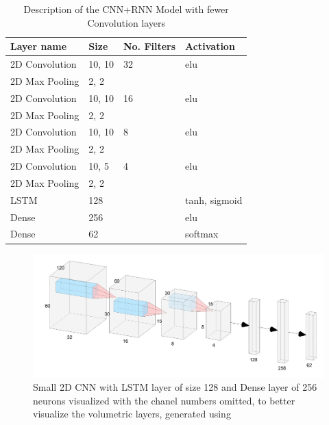 \documentclass[12pt]{article}
\theoremstyle{definition}
\begin{document}
	\begin{table}[h]
		\centering
		\renewcommand{\arraystretch}{1.5}

		\caption{Description of the CNN+RNN Model with fewer Convolution layers}
		\label{table:small-CNN-LSTM}

		\begin{tabularx}{\textwidth}{XXXX}
			\textbf{Layer name} & \textbf{Size} & \textbf{No. Filters} & \textbf{Activation} \\ \hline
			2D Convolution & 10, 10 & 32                   & elu                  \\ \hline
			2D Max Pooling & 2, 2   & \textbf{\textendash} & \textbf{\textendash} \\ \hline
			2D Convolution & 10, 10 & 16                   & elu                  \\ \hline
			2D Max Pooling & 2, 2   & \textbf{\textendash} & \textbf{\textendash} \\ \hline
			2D Convolution & 10, 10 & 8                    & elu                  \\ \hline
			2D Max Pooling & 2, 2   & \textbf{\textendash} & \textbf{\textendash} \\ \hline
			2D Convolution & 10, 5  & 4                    & elu                  \\ \hline
			2D Max Pooling & 2, 2   & \textbf{\textendash} & \textbf{\textendash} \\ \hline
			LSTM           & 128    & \textbf{\textendash} & tanh, sigmoid        \\ \hline
			Dense          & 256    & \textbf{\textendash} & elu                  \\ \hline
			Dense          & 62     & \textbf{\textendash} & softmax              \\
		\end{tabularx}
	\end{table}

	\begin{figure}
		\includegraphics[width=\textwidth]{networks/small-2D-CNN-LSTM-Dense.png}
		\caption{Small 2D CNN with LSTM layer of size 128 and Dense layer of 256 neurons visualized with the chanel numbers omitted, to better visualize the volumetric layers, generated using \cite{nn-svg}}
		\label{figure:small-2D-CNN-LSTM-Dense}
	\end{figure}
\end{document}
